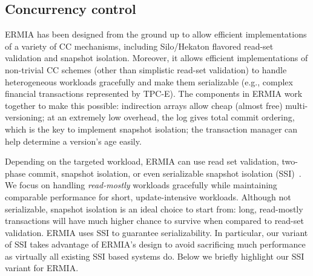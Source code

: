 \subsection{Concurrency control}

ERMIA has been designed from the ground up to allow efficient implementations of a variety of CC mechanisms, including Silo/Hekaton flavored read-set validation and snapshot isolation. Moreover, it allows efficient implementations of non-trivial CC schemes (other than simplistic read-set validation) to handle heterogeneous workloads gracefully and make them serializable (e.g., complex financial transactions represented by TPC-E). The components in ERMIA work together to make this possible: indirection arrays allow cheap (almost free) multi-versioning; at an extremely low overhead, the log gives total commit ordering, which is the key to implement snapshot isolation; the transaction manager can help determine a version's age easily.

Depending on the targeted workload, ERMIA can use read set validation, two-phase commit, snapshot isolation, or even serializable snapshot isolation (SSI)~\cite{Cahill08RF}. We focus on handling \textit{read-mostly} workloads gracefully while maintaining comparable performance for short, update-intensive workloads. Although not serializable, snapshot isolation is an ideal choice to start from: long, read-mostly transactions will have much higher chance to survive when compared to read-set validation. ERMIA uses SSI to guarantee serializability. In particular, our variant of SSI takes advantage of ERMIA's design to avoid sacrificing much performance as virtually all existing SSI based systems do. Below we briefly highlight our SSI variant for ERMIA.


